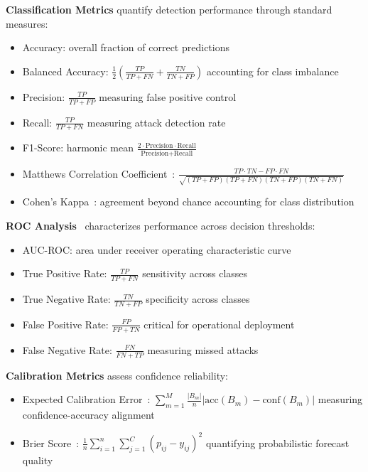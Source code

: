 \textbf{Classification Metrics} quantify detection performance through standard measures:
\begin{itemize}[leftmargin=1.5em]
\item Accuracy: overall fraction of correct predictions
\item Balanced Accuracy: $\frac{1}{2}(\frac{TP}{TP+FN} + \frac{TN}{TN+FP})$ accounting for class imbalance
\item Precision: $\frac{TP}{TP+FP}$ measuring false positive control
\item Recall: $\frac{TP}{TP+FN}$ measuring attack detection rate
\item F1-Score: harmonic mean $\frac{2 \cdot \text{Precision} \cdot \text{Recall}}{\text{Precision} + \text{Recall}}$
\item Matthews Correlation Coefficient~\cite{matthews1975comparison}: $\frac{TP \cdot TN - FP \cdot FN}{\sqrt{(TP+FP)(TP+FN)(TN+FP)(TN+FN)}}$
\item Cohen's Kappa~\cite{cohen1960coefficient}: agreement beyond chance accounting for class distribution
\end{itemize}

\textbf{ROC Analysis}~\cite{fawcett2006roc} characterizes performance across decision thresholds:
\begin{itemize}[leftmargin=1.5em]
\item AUC-ROC: area under receiver operating characteristic curve
\item True Positive Rate: $\frac{TP}{TP+FN}$ sensitivity across classes
\item True Negative Rate: $\frac{TN}{TN+FP}$ specificity across classes
\item False Positive Rate: $\frac{FP}{FP+TN}$ critical for operational deployment
\item False Negative Rate: $\frac{FN}{FN+TP}$ measuring missed attacks
\end{itemize}

\textbf{Calibration Metrics} assess confidence reliability:
\begin{itemize}[leftmargin=1.5em]
\item Expected Calibration Error~\cite{guo2017calibration}: $\sum_{m=1}^M \frac{|B_m|}{n}|\text{acc}(B_m) - \text{conf}(B_m)|$ measuring confidence-accuracy alignment
\item Brier Score~\cite{brier1950verification}: $\frac{1}{n}\sum_{i=1}^n \sum_{j=1}^C (p_{ij} - y_{ij})^2$ quantifying probabilistic forecast quality
\end{itemize}

